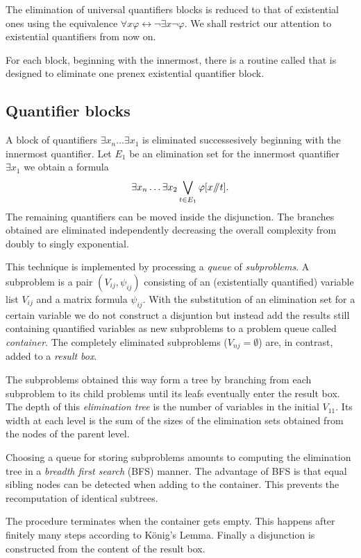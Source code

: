 The elimination of universal quantifiers blocks is reduced to that of
existential ones using the equivalence $\forall
x\varphi\longleftrightarrow \lnot\exists x\lnot\varphi$. We shall
restrict our attention to existential quantifiers from now on.

For each block, beginning with the innermost, there is a routine
called that is designed to eliminate one prenex existential quantifier
block.
%
\subsection{Quantifier blocks}
A block of quantifiers $\exists x_n\ldots\exists x_1$ is eliminated
successesively beginning with the innermost quantifier. Let $E_1$ be
an elimination set for the innermost quantifier $\exists x_1$ we
obtain a formula
$$
\exists x_n\ldots\exists x_2\bigvee_{t\in E_1}\varphi[x/\kern-3pt/ t].
$$
The remaining quantifiers can be moved inside the disjunction. The
branches obtained are eliminated independently decreasing the overall
complexity from doubly to singly exponential.

This technique is implemented by processing a {\em queue} of {\em
subproblems}. A subproblem is a pair $(V_{ij},\psi_{ij})$ consisting
of an (existentially quantified) variable list $V_{ij}$ and a matrix
formula $\psi_{ij}$. With the substitution of an elimination set for a
certain variable we do not construct a disjuntion but instead add the
results still containing quantified variables as new subproblems to a
problem queue called {\em container}. The completely eliminated
subproblems ($V_{nj}=\emptyset$) are, in contrast, added to a {\em
result box}.

The subproblems obtained this way form a tree by branching from each
subproblem to its child problems until its leafs eventually enter the
result box. The depth of this {\em elimination tree} is the number of
variables in the initial $V_{11}$. Its width at each level is the sum
of the sizes of the elimination sets obtained from the nodes of the
parent level.

Choosing a queue for storing subproblems amounts to computing the
elimination tree in a {\em breadth first search} (BFS) manner. The
advantage of BFS is that equal sibling nodes can be detected when
adding to the container. This prevents the recomputation of identical
subtrees.

The procedure terminates when the container gets empty. This happens
after finitely many steps according to K\"onig's Lemma. Finally a
disjunction is constructed from the content of the result box.

